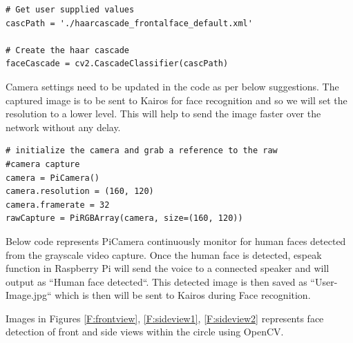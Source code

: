 \documentclass[sigconf]{acmart}
\begin{document}
\begin{verbatim}
# Get user supplied values
cascPath = './haarcascade_frontalface_default.xml'

# Create the haar cascade
faceCascade = cv2.CascadeClassifier(cascPath)
\end{verbatim}


Camera settings need to be updated in the code as per below suggestions. The captured image is to be sent to Kairos for face recognition and so we will set the resolution to a lower level. This will help to send the image faster over the network without any delay.


\begin{verbatim}
# initialize the camera and grab a reference to the raw 
#camera capture
camera = PiCamera()
camera.resolution = (160, 120)
camera.framerate = 32
rawCapture = PiRGBArray(camera, size=(160, 120))
\end{verbatim}


Below code represents PiCamera continuously monitor for human faces detected from the grayscale video capture. Once the human face is detected, espeak function in Raspberry Pi will send the voice to a connected speaker and will output as ``Human face detected``. This detected image is then saved as ``User-Image.jpg`` which is then will be sent to Kairos during Face recognition.

Images in Figures \ref{F:frontview}, \ref{F:sideview1}, \ref{F:sideview2} represents face detection of front and side views within the circle using OpenCV.
\end{document}
